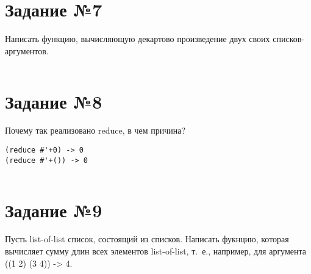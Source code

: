 \vspace{4mm}
\begin{minipage}{0.92\linewidth}
\begin{lstlisting}
\end{lstlisting}
\end{minipage}

\section{Задание №7}

Написать функцию, вычисляющую декартово произведение двух своих
списков-аргументов.

\vspace{4mm}
\begin{minipage}{0.92\linewidth}
\begin{lstlisting}
\end{lstlisting}
\end{minipage}

\section{Задание №8}

Почему так реализовано reduce, в чем причина?

\vspace{4mm}
\begin{minipage}{0.92\linewidth}
\begin{lstlisting}
(reduce #'+0) -> 0
(reduce #'+()) -> 0
\end{lstlisting}
\end{minipage}

\vspace{4mm}
\begin{minipage}{0.92\linewidth}
\begin{lstlisting}
\end{lstlisting}
\end{minipage}


\section{Задание №9}

Пусть list-of-list список, состоящий из списков. Написать фукнцию, которая
вычисляет сумму длин всех элементов list-of-list, т.~е., например, для
аргумента ((1 2) (3 4)) -> 4.

\vspace{4mm}
\begin{minipage}{0.92\linewidth}
\begin{lstlisting}
\end{lstlisting}
\end{minipage}

